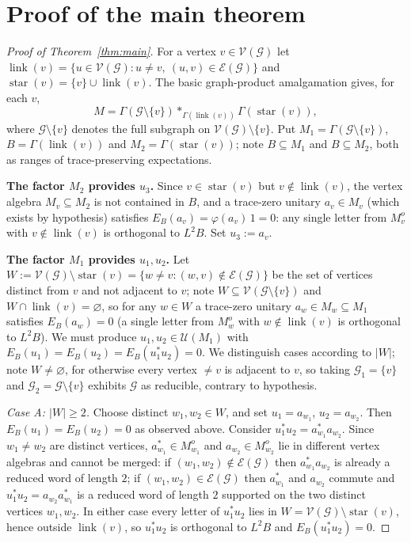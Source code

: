 \documentclass[a4paper, 11pt, reqno]{amsart}
\numberwithin{equation}{section}
\theoremstyle{plain}
\theoremstyle{remark}
\theoremstyle{definition}
\newcommand{\VV}{{\mathcal V}}
\newcommand{\EE}{{\mathcal E}}
\newcommand{\GG}{{\mathcal G}}
\begin{document}
\section{Proof of the main theorem}

\begin{proof}[Proof of Theorem~\ref{thm:main}]
For a vertex $v\in\VV(\GG)$ let $\operatorname{link}(v)=\{u\in\VV(\GG):u\neq v,\ (u,v)\in\EE(\GG)\}$ and $\operatorname{star}(v)=\{v\}\cup\operatorname{link}(v)$. The basic graph-product amalgamation \cite{Gr90,CaFi17} gives, for each $v$,
\begin{equation}\label{eq:star-decomp}
M=\Gamma(\GG\setminus\{v\})*_{\Gamma(\operatorname{link}(v))}\Gamma(\operatorname{star}(v)),
\end{equation}
where $\GG\setminus\{v\}$ denotes the full subgraph on $\VV(\GG)\setminus\{v\}$. Put $M_1=\Gamma(\GG\setminus\{v\})$, $B=\Gamma(\operatorname{link}(v))$ and $M_2=\Gamma(\operatorname{star}(v))$; note $B\subseteq M_1$ and $B\subseteq M_2$, both as ranges of trace-preserving expectations.

\medskip\noindent\textbf{The factor $M_2$ provides $u_3$.}
Since $v\in\operatorname{star}(v)$ but $v\notin\operatorname{link}(v)$, the vertex algebra $M_v\subseteq M_2$ is not contained in $B$, and a trace-zero unitary $a_v\in M_v$ (which exists by hypothesis) satisfies $E_B(a_v)=\varphi(a_v)\,1=0$: any single letter from $M_v^o$ with $v\notin\operatorname{link}(v)$ is orthogonal to $L^2B$. Set $u_3:=a_v$.

\medskip\noindent\textbf{The factor $M_1$ provides $u_1,u_2$.}
Let $W:=\VV(\GG)\setminus\operatorname{star}(v)=\{w\neq v:(w,v)\notin\EE(\GG)\}$ be the set of vertices distinct from $v$ and not adjacent to $v$; note $W\subseteq\VV(\GG\setminus\{v\})$ and $W\cap\operatorname{link}(v)=\varnothing$, so for any $w\in W$ a trace-zero unitary $a_w\in M_w\subseteq M_1$ satisfies $E_B(a_w)=0$ (a single letter from $M_w^o$ with $w\notin\operatorname{link}(v)$ is orthogonal to $L^2B$). We must produce $u_1,u_2\in\mathcal U(M_1)$ with $E_B(u_1)=E_B(u_2)=E_B(u_1^*u_2)=0$. We distinguish cases according to $|W|$; note $W\neq\varnothing$, for otherwise every vertex $\neq v$ is adjacent to $v$, so taking $\GG_1=\{v\}$ and $\GG_2=\GG\setminus\{v\}$ exhibits $\GG$ as reducible, contrary to hypothesis.

\emph{Case A: $|W|\ge2$.} Choose distinct $w_1,w_2\in W$, and set $u_1=a_{w_1}$, $u_2=a_{w_2}$. Then $E_B(u_1)=E_B(u_2)=0$ as observed above. Consider $u_1^*u_2=a_{w_1}^*a_{w_2}$. Since $w_1\neq w_2$ are distinct vertices, $a_{w_1}^*\in M_{w_1}^o$ and $a_{w_2}\in M_{w_2}^o$ lie in different vertex algebras and cannot be merged: if $(w_1,w_2)\notin\EE(\GG)$ then $a_{w_1}^*a_{w_2}$ is already a reduced word of length $2$; if $(w_1,w_2)\in\EE(\GG)$ then $a_{w_1}^*$ and $a_{w_2}$ commute and $u_1^*u_2=a_{w_2}a_{w_1}^*$ is a reduced word of length $2$ supported on the two distinct vertices $w_1,w_2$. In either case every letter of $u_1^*u_2$ lies in $W=\VV(\GG)\setminus\operatorname{star}(v)$, hence outside $\operatorname{link}(v)$, so $u_1^*u_2$ is orthogonal to $L^2B$ and $E_B(u_1^*u_2)=0$.


\end{proof}
\end{document}
